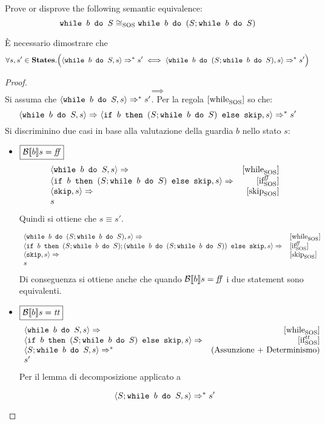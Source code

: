 {Prove or disprove the following semantic equivalence:
$$
\wbS{b}{S} \eqSOS \wbS{b}{(S;\wbS{b}{S})}
$$
}
{
È necessario dimostrare che
$$
\forall s,s' \in \states. \Big(\confSs{\wbS{b}{S}}{s} \Rar{*} s' \iff \confSs{\wbS{b}{(S;\wbS{b}{S})}}{s} \Rar{*} s' \Big)
$$
\begin{proof}
$$
\boxed{\implies}
$$
Si assuma che $\confSs{\wbS{b}{S}}{s} \Rar{*} s'$.
Per la regola $\whileSOS$ so che:
$$
\confSs{\wbS{b}{S}}{s} \Rar{} \confSs{\ifABC{b}{(S; \wbS{b}{S})}{\skipForFriends}}{s} \Rar{*} s'
$$
Si discriminino due casi in base alla valutazione della guardia $b$ nello
stato $s$:
\begin{itemize}
	\item $\boxed{\B{b} = \semfalse}$
	$$
	\begin{array}{lr}
	\confSs{\wbS{b}{S}}{s} \Rar{ } & \whileSOS \\
	\confSs{\ifABC{b}{(S; \wbS{b}{S})}{\skipForFriends}}{s} \Rar{ }& \ifffSOS \\
	\confSs{\skipForFriends}{s} \Rar{} & \skipSOS\\
	s
	\end{array}
	$$
	Quindi si ottiene che $s \equiv{} s'$.
	
	$$
	\begin{array}{ll}
	\confSs{\wbS{b}{(S;\wbS{b}{S})}}{s} \Rar{ } & \whileSOS\\	
	\confSs{\ifABC{b}{(S; \wbS{b}{S}); (\wbS{b}{(S;\wbS{b}{S})})}{\skipForFriends}}{s} \Rar{ } & \ifffSOS \\
	\confSs{\skipForFriends}{s} \Rar{ } & \skipSOS\\
	s
	\end{array}
	$$
	Di conseguenza si ottiene anche che quando $\B{b} = \semfalse$ i due
	statement sono equivalenti.
	
	\item $\boxed{\B{b} = \semtrue}$
	$$
	\begin{array}{lr}
	\confSs{\wbS{b}{S}}{s} \Rar{ }  & \whileSOS \\
	\confSs{\ifABC{b}{(S;\wbS{b}{S})}{\skipForFriends}}{s} \Rar{ } & \ifttSOS\\
	\confSs{S; \wbS{b}{S}}{s} \Rar{*} & (\text{Assunzione + Determinismo})\\
	s'
	\end{array}
	$$
	Per il lemma di decomposizione applicato a
	
	\begin{equation}
	\confSs{S; \wbS{b}{S}}{s} \Rar{*} s'
		\label{eq:hw7:imp}
	\end{equation}


\end{itemize}
\end{proof}}
